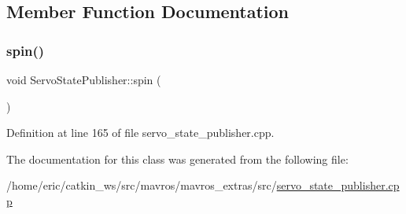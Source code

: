 \subsection{Member Function Documentation}
\mbox{\label{classServoStatePublisher_a6ef5f5e674a47879a36c6286e601fb9d}} 
\subsubsection{\texorpdfstring{spin()}{spin()}}
{\footnotesize\ttfamily void Servo\+State\+Publisher\+::spin (\begin{DoxyParamCaption}{ }\end{DoxyParamCaption})\hspace{0.3cm}{\ttfamily [inline]}}



Definition at line 165 of file servo\+\_\+state\+\_\+publisher.\+cpp.



The documentation for this class was generated from the following file\+:\begin{DoxyCompactItemize}
\item 
/home/eric/catkin\+\_\+ws/src/mavros/mavros\+\_\+extras/src/\mbox{\hyperlink{servo__state__publisher_8cpp}{servo\+\_\+state\+\_\+publisher.\+cpp}}\end{DoxyCompactItemize}

